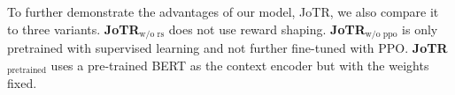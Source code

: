 \documentclass[letterpaper]{article} %
\begin{document}
To further demonstrate the advantages of our model, JoTR, we also compare it to three variants. \textbf{JoTR$_{\text{w/o rs}}$} does not use reward shaping. \textbf{JoTR$_{\text{w/o ppo}}$} is only pretrained with supervised learning and not further fine-tuned with PPO. \textbf{JoTR$_{\text{pretrained}}$} uses a pre-trained BERT as the context encoder but with the weights fixed.

\end{document}
